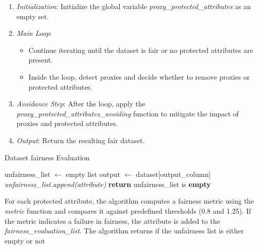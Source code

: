 \documentclass[12pt,a4paper,openright,twoside]{book}
\begin{document}
\begin{enumerate}

    \item \emph{Initialization}: Initialize the global variable \textit{proxy\_protected\_attributes} as an empty set.

    \item \emph{Main Loop}:

        \begin{itemize}

            \item Continue iterating until the dataset is fair or no protected attributes are present.

            \item Inside the loop, detect proxies and decide whether to remove proxies or protected attributes.

        \end{itemize}

    \item \emph{Avoidance Step}: After the loop, apply the \textit{proxy\_protected\_attributes\_avoiding} function to mitigate the impact of proxies and protected attributes.
    
    \item \emph{Output}: Return the resulting fair dataset.

\end{enumerate}

\begin{algorithm}[H]
    \caption{Dataset fairness Evaluation}
    \label{alg:fairness_evaluation}
    \begin{algorithmic}[1]
        \State unfairness\_list $\gets$ empty list\;
        \State output $\gets$ dataset[output\_column]\;
                \State \textit{unfairness\_list.append(attribute)}\;
            \EndIf
        \EndFor
        \State \textbf{return} unfairness\_list is \textbf{empty}
    \end{algorithmic}
\end{algorithm}

For each protected attribute, the algorithm computes a fairness metric using the \textit{metric} function and compares it against predefined thresholds (0.8 and 1.25). If the metric indicates a failure in fairness, the attribute is added to the \textit{fairness\_evaluation\_list}. The algorithm returns if the unfairness list is either empty or not
\end{document}
